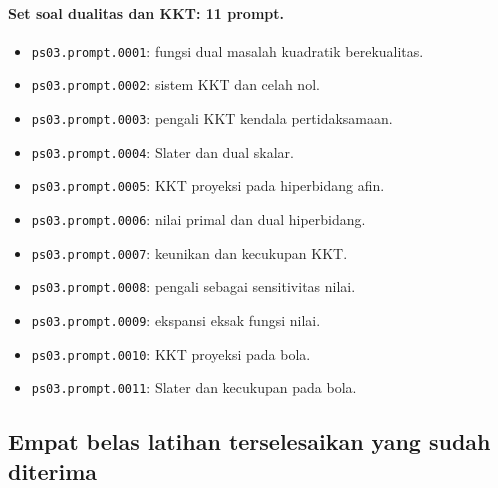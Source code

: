 \paragraph{Set soal dualitas dan KKT: 11 prompt.}
\begin{itemize}
\item \texttt{ps03.prompt.0001}: fungsi dual masalah kuadratik berekualitas.
\item \texttt{ps03.prompt.0002}: sistem KKT dan celah nol.
\item \texttt{ps03.prompt.0003}: pengali KKT kendala pertidaksamaan.
\item \texttt{ps03.prompt.0004}: Slater dan dual skalar.
\item \texttt{ps03.prompt.0005}: KKT proyeksi pada hiperbidang afin.
\item \texttt{ps03.prompt.0006}: nilai primal dan dual hiperbidang.
\item \texttt{ps03.prompt.0007}: keunikan dan kecukupan KKT.
\item \texttt{ps03.prompt.0008}: pengali sebagai sensitivitas nilai.
\item \texttt{ps03.prompt.0009}: ekspansi eksak fungsi nilai.
\item \texttt{ps03.prompt.0010}: KKT proyeksi pada bola.
\item \texttt{ps03.prompt.0011}: Slater dan kecukupan pada bola.
\end{itemize}

\subsection{Empat belas latihan terselesaikan yang sudah diterima}


